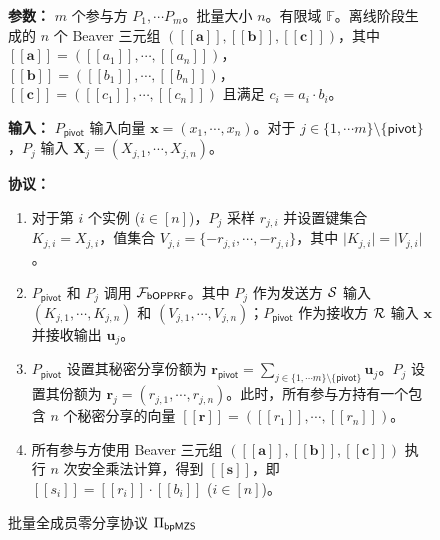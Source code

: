 \begin{figure}[!hbtp]
\begin{framed}
\begin{minipage}[c]{\textwidth}
\begin{trivlist}
\item \textbf{参数：} $m$ 个参与方 $P_1, \cdots P_m$。批量大小 $n$。有限域 $\mathbb{F}$。离线阶段生成的 $n$ 个 Beaver 三元组 $([\! [ \textbf{a} ] \!], [\! [ \textbf{b} ] \!], [\! [ \textbf{c} ] \!])$，其中 $[\! [ \textbf{a} ] \!] = ([\! [ a_1 ] \!], \cdots, [\! [ a_n ] \!])$，$[\! [ \textbf{b} ] \!] = ([\! [ b_1 ] \!], \cdots, [\! [ b_n ] \!])$，$[\! [ \textbf{c} ] \!] = ([\! [ c_1 ] \!], \cdots, [\! [ c_n ] \!])$ 且满足 $c_i = a_i \cdot b_i$。
\item \textbf{输入：} $P_\mathsf{pivot}$ 输入向量 $\textbf{x} = (x_1, \cdots, x_n)$。对于 $j \in \{1,\cdots m\} \setminus \{\mathsf{pivot}\}$，$P_j$ 输入 $\textbf{X}_j = (X_{j,1}, \cdots, X_{j,n})$。
\item \textbf{协议：}
\begin{enumerate}[itemsep=2pt,topsep=0pt,parsep=0pt,leftmargin=15pt]
\item 对于第 $i$ 个实例 ($i \in [n]$)，$P_j$ 采样 $r_{j,i}$ 并设置键集合 $K_{j,i} = X_{j,i}$，值集合 $V_{j,i} = \{-r_{j,i}, \cdots, -r_{j,i}\}$，其中 $\lvert K_{j,i} \rvert = \lvert V_{j,i} \rvert$。
\item $P_\mathsf{pivot}$ 和 $P_j$ 调用 $\mathcal{F}_\mathsf{bOPPRF}$。其中 $P_j$ 作为发送方 $\mathcal{S}$ 输入 $(K_{j,1},\cdots,K_{j,n})$ 和 $(V_{j,1},\cdots,V_{j,n})$；$P_\mathsf{pivot}$ 作为接收方 $\mathcal{R}$ 输入 $\textbf{x}$ 并接收输出 $\textbf{u}_{j}$。
\item $P_\mathsf{pivot}$ 设置其秘密分享份额为 $\textbf{r}_{\mathsf{pivot}} = \sum_{j\in \{1,\cdots m\} \setminus \{\mathsf{pivot}\}} \textbf{u}_{j}$。$P_j$ 设置其份额为 $\textbf{r}_{j} = (r_{j,1}, \cdots, r_{j,n})$。此时，所有参与方持有一个包含 $n$ 个秘密分享的向量 $[\! [ \textbf{r} ] \!] = ([\! [ r_1 ] \!], \cdots, [\! [ r_n ] \!])$。
\item 所有参与方使用 Beaver 三元组 $([\! [ \textbf{a} ] \!], [\! [ \textbf{b} ] \!], [\! [ \textbf{c} ] \!])$ 执行 $n$ 次安全乘法计算，得到 $[\! [ \textbf{s} ] \!]$，即 $[\! [ s_i ] \!] = [\! [ r_i ] \!] \cdot [\! [ b_i ] \!]$ ($i \in [n]$)。
\end{enumerate}
\end{trivlist}
\end{minipage}
\end{framed}
\caption{批量全成员零分享协议 $\Pi_\mathsf{bpMZS}$}\label{fig:proto-bpmzs}
\end{figure}

